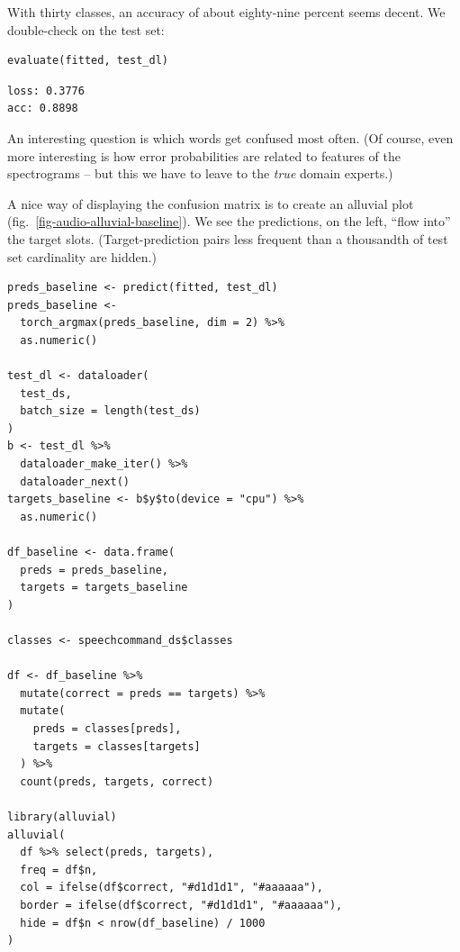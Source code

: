 \documentclass[
  letterpaper,
]{krantz}
\begin{document}
With thirty classes, an accuracy of about eighty-nine percent seems
decent. We double-check on the test set:

\begin{verbatim}
evaluate(fitted, test_dl)
\end{verbatim}

\begin{verbatim}
loss: 0.3776
acc: 0.8898
\end{verbatim}

An interesting question is which words get confused most often. (Of
course, even more interesting is how error probabilities are related to
features of the spectrograms -- but this we have to leave to the
\emph{true} domain experts.)

A nice way of displaying the confusion matrix is to create an alluvial
plot (fig.~\ref{fig-audio-alluvial-baseline}). We see the predictions,
on the left, ``flow into'' the target slots. (Target-prediction pairs
less frequent than a thousandth of test set cardinality are hidden.)

\begin{verbatim}
preds_baseline <- predict(fitted, test_dl)
preds_baseline <-
  torch_argmax(preds_baseline, dim = 2) %>%
  as.numeric()

test_dl <- dataloader(
  test_ds,
  batch_size = length(test_ds)
)
b <- test_dl %>%
  dataloader_make_iter() %>%
  dataloader_next()
targets_baseline <- b$y$to(device = "cpu") %>%
  as.numeric()

df_baseline <- data.frame(
  preds = preds_baseline,
  targets = targets_baseline
)

classes <- speechcommand_ds$classes

df <- df_baseline %>%
  mutate(correct = preds == targets) %>%
  mutate(
    preds = classes[preds],
    targets = classes[targets]
  ) %>%
  count(preds, targets, correct)

library(alluvial)
alluvial(
  df %>% select(preds, targets),
  freq = df$n,
  col = ifelse(df$correct, "#d1d1d1", "#aaaaaa"),
  border = ifelse(df$correct, "#d1d1d1", "#aaaaaa"),
  hide = df$n < nrow(df_baseline) / 1000
)
\end{verbatim}
\end{document}
